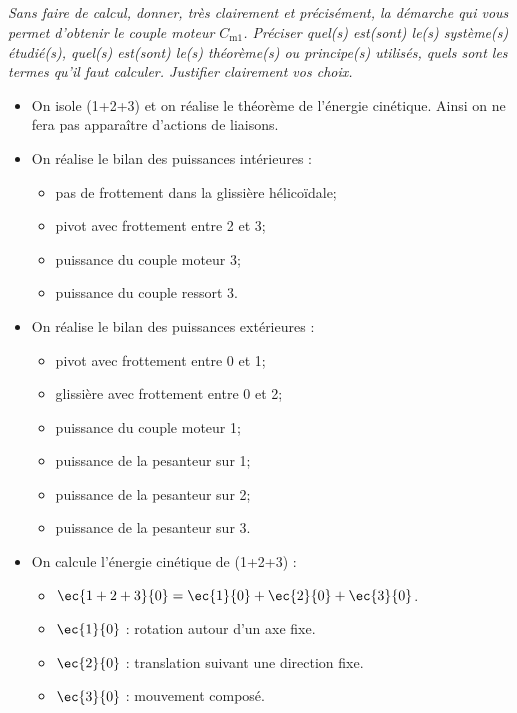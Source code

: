 \subparagraph{\label{q_05}}\textit{Sans faire de calcul, donner, très clairement et précisément, la démarche qui vous permet d’obtenir
le couple moteur $C_{\text{m1}}$. Préciser quel(s) est(sont) le(s) système(s) étudié(s), quel(s) est(sont) le(s)
théorème(s) ou principe(s) utilisés, quels sont les termes qu’il faut calculer. Justifier clairement vos
choix.}
\ifprof
\begin{corrige}
\begin{itemize}
\item On isole (1+2+3) et on réalise le théorème de l'énergie cinétique. Ainsi on ne fera pas apparaître d'actions de liaisons.
\item On réalise le bilan des puissances intérieures : 
\begin{itemize}
\item pas de frottement dans la glissière hélicoïdale;
\item pivot avec frottement entre 2 et 3;
\item puissance du couple moteur 3; 
\item puissance du couple ressort 3.
\end{itemize}
\item On réalise le bilan des puissances extérieures : 
\begin{itemize}
\item pivot avec frottement entre 0 et 1;
\item glissière avec frottement entre 0 et 2;
\item puissance du couple moteur 1; 
\item puissance de la pesanteur sur 1; 
\item puissance de la pesanteur sur 2; 
\item puissance de la pesanteur sur 3.
\end{itemize}
\item On calcule l'énergie cinétique de (1+2+3) :
\begin{itemize}
\item $\ec{1+2+3}{0}=\ec{1}{0}+\ec{2}{0}+\ec{3}{0}$.
\item $\ec{1}{0}$ : rotation autour d'un axe fixe.
\item $\ec{2}{0}$ : translation suivant une direction fixe.
\item $\ec{3}{0}$ : mouvement composé. 
\end{itemize}
\end{itemize}
\end{corrige}
\else
\fi

